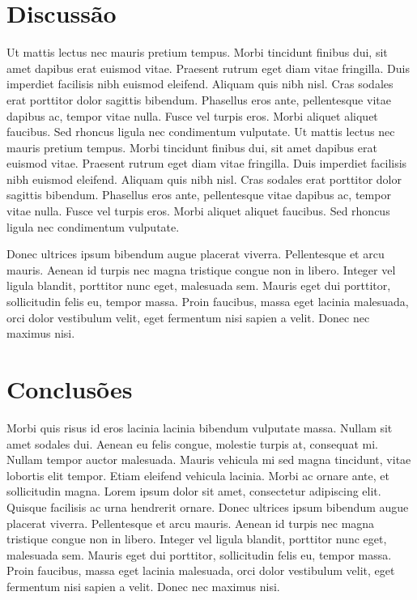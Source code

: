 \documentclass[12pt]{article}
\begin{document}
\section*{Discussão }

Ut mattis lectus nec mauris pretium tempus. Morbi tincidunt finibus dui, sit amet dapibus erat euismod vitae. Praesent rutrum eget diam vitae fringilla. Duis imperdiet facilisis nibh euismod eleifend. Aliquam quis nibh nisl. Cras sodales erat porttitor dolor sagittis bibendum. Phasellus eros ante, pellentesque vitae dapibus ac, tempor vitae nulla. Fusce vel turpis eros. Morbi aliquet aliquet faucibus. Sed rhoncus ligula nec condimentum vulputate. Ut mattis lectus nec mauris pretium tempus. Morbi tincidunt finibus dui, sit amet dapibus erat euismod vitae. Praesent rutrum eget diam vitae fringilla. Duis imperdiet facilisis nibh euismod eleifend. Aliquam quis nibh nisl. Cras sodales erat porttitor dolor sagittis bibendum. Phasellus eros ante, pellentesque vitae dapibus ac, tempor vitae nulla. Fusce vel turpis eros. Morbi aliquet aliquet faucibus. Sed rhoncus ligula nec condimentum vulputate.

	Donec ultrices ipsum bibendum augue placerat viverra. Pellentesque et arcu mauris. Aenean id turpis nec magna tristique congue non in libero. Integer vel ligula blandit, porttitor nunc eget, malesuada sem. Mauris eget dui porttitor, sollicitudin felis eu, tempor massa. Proin faucibus, massa eget lacinia malesuada, orci dolor vestibulum velit, eget fermentum nisi sapien a velit. Donec nec maximus nisi.

\section*{Conclusões }

Morbi quis risus id eros lacinia lacinia bibendum vulputate massa. Nullam sit amet sodales dui. Aenean eu felis congue, molestie turpis at, consequat mi. Nullam tempor auctor malesuada. Mauris vehicula mi sed magna tincidunt, vitae lobortis elit tempor. Etiam eleifend vehicula lacinia. Morbi ac ornare ante, et sollicitudin magna. Lorem ipsum dolor sit amet, consectetur adipiscing elit. Quisque facilisis ac urna hendrerit ornare. Donec ultrices ipsum bibendum augue placerat viverra. Pellentesque et arcu mauris. Aenean id turpis nec magna tristique congue non in libero. Integer vel ligula blandit, porttitor nunc eget, malesuada sem. Mauris eget dui porttitor, sollicitudin felis eu, tempor massa. Proin faucibus, massa eget lacinia malesuada, orci dolor vestibulum velit, eget fermentum nisi sapien a velit. Donec nec maximus nisi. 
\end{document}
